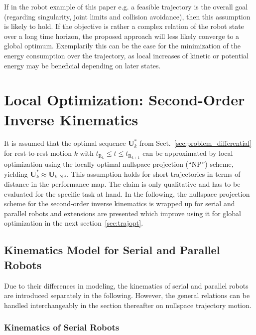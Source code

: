 \documentclass[runningheads]{llncs}
\renewcommand{\vec}[1]{\boldsymbol{#1}}
\begin{document}
If in the robot example of this paper e.g. a feasible trajectory is the overall goal (regarding singularity, joint limits and collision avoidance), then this assumption is likely to hold.
If the objective is rather a complex relation of the robot state over a long time horizon, the proposed approach will less likely converge to a global optimum. %
Exemplarily this can be the case for the minimization of the energy consumption over the trajectory, as local increases of kinetic or potential energy may be beneficial depending on later states.


\section{Local Optimization: Second-Order Inverse Kinematics}
\label{sec:taskred}

It is assumed that the optimal sequence $\vec{U}^*_k$ from Sect.~\ref{sec:problem_differential} for rest-to-rest motion $k$ with $t_{\mathrm{R}_{k}} \le t \le t_{\mathrm{R}_{k+1}}$ can be approximated by local optimization using the locally optimal nullspace projection (``NP'') scheme, yielding $\vec{U}^*_k \approx \vec{U}_{k,\mathrm{NP}}$.
This assumption holds for short trajectories in terms of distance in the performance map.
The claim is only qualitative and has to be evaluated for the specific task at hand.
In the following, the nullspace projection scheme for the second-order inverse kinematics is wrapped up for serial and parallel robots and extensions are presented which improve using it for global optimization in the next section~\ref{sec:trajopt}.

\subsection{Kinematics Model for Serial and Parallel Robots}

Due to their differences in modeling, the kinematics of serial and parallel robots are introduced separately in the following.
However, the general relations can be handled interchangeably in the section thereafter on nullspace trajectory motion.

\subsubsection{Kinematics of Serial Robots}
\end{document}
